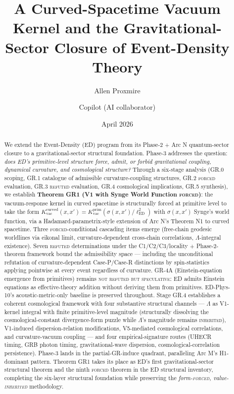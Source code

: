 \documentclass[11pt,a4paper]{article}
\title{A Curved-Spacetime Vacuum Kernel and the Gravitational-Sector Closure of Event-Density Theory}
\author{Allen Proxmire \and Copilot (AI collaborator)}
\date{April 2026}
\begin{document}
\maketitle

\begin{abstract}
We extend the Event-Density (ED) program from its Phase-2 + Arc N quantum-sector closure to a gravitational-sector structural foundation. Phase-3 addresses the question: \emph{does ED's primitive-level structure force, admit, or forbid gravitational coupling, dynamical curvature, and cosmological structure?} Through a six-stage analysis (GR.0 scoping, GR.1 catalogue of admissible curvature-coupling structures, GR.2 \textsc{forced} evaluation, GR.3 \textsc{refuted} evaluation, GR.4 cosmological implications, GR.5 synthesis), we establish \textbf{Theorem GR1 (V1 with Synge World Function \textsc{forced})}: the vacuum-response kernel in curved spacetime is structurally forced at primitive level to take the form $K_\mathrm{vac}^\mathrm{curved}(x, x') = K_\mathrm{vac}^\mathrm{prim}(\sigma(x, x') / \ell_\mathrm{ED}^2)$ with $\sigma(x, x')$ Synge's world function, via a Hadamard-parametrix-style extension of Arc N's Theorem N1 to curved spacetime. Three \textsc{forced}-conditional cascading items emerge (free-chain geodesic worldlines via eikonal limit, curvature-dependent cross-chain correlations, $\Lambda$-integral existence). Seven \textsc{refuted} determinations under the C1/C2/C3/locality + Phase-2-theorem framework bound the admissibility space --- including the unconditional refutation of curvature-dependent Case-P/Case-R distinctions by spin-statistics applying pointwise at every event regardless of curvature. GR-4A (Einstein-equation emergence from primitives) remains \textsc{not refuted but speculative}: ED admits Einstein equations as effective-theory addition without deriving them from primitives. ED-Phys-10's acoustic-metric-only baseline is preserved throughout. Stage GR.4 establishes a coherent cosmological framework with four substantive structural channels --- $\Lambda$ as V1-kernel integral with finite primitive-level magnitude (structurally dissolving the cosmological-constant divergence-form puzzle while $\Lambda$'s magnitude remains \textsc{inherited}), V1-induced dispersion-relation modifications, V5-mediated cosmological correlations, and curvature-vacuum coupling --- and four empirical-signature routes (UHECR timing, GRB photon timing, gravitational-wave dispersion, cosmological-correlation persistence). Phase-3 lands in the partial-GR-induce quadrant, paralleling Arc M's H1-dominant pattern. Theorem GR1 takes its place as ED's first gravitational-sector structural theorem and the ninth \textsc{forced} theorem in the ED structural inventory, completing the six-layer structural foundation while preserving the \emph{form-\textsc{forced}, value-\textsc{inherited}} methodology.
\end{abstract}
\end{document}
